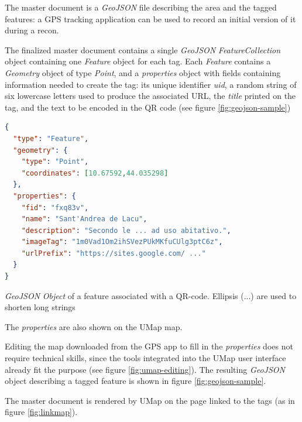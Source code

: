 \documentclass[sustainability,article,submit,pdftex,moreauthors]{Definitions/mdpi}
\begin{document}
The master document is a \emph{GeoJSON} file describing the area and the tagged features: a GPS tracking application can be used to record an initial version of it during a recon.

The finalized master document contains a single \emph{GeoJSON} \emph{FeatureCollection} object containing one \emph{Feature} object for each tag. Each \emph{Feature} contains a \emph{Geometry} object of type \emph{Point}, and a \emph{properties} object with fields containing information needed to create the tag: its unique identifier \emph{uid}, a random string of six lowercase letters used to produce the associated URL, the \emph{title} printed on the tag, and the text to be encoded in the QR code (see figure \ref{fig:geojson-sample})

\begin{table}
\begin{lstlisting}[language=json]
{
  "type": "Feature",
  "geometry": { 
    "type": "Point", 
    "coordinates": [10.67592,44.035298]
  },
  "properties": {
    "fid": "fxq83v",
    "name": "Sant'Andrea de Lacu",
    "description": "Secondo le ... ad uso abitativo.",
    "imageTag": "1m0Vad1Om2ihSVezPUkMKfuCUlg3ptC6z",
    "urlPrefix": "https://sites.google.com/ ..."
  }
}
\end{lstlisting}
\caption{\emph{GeoJSON} \emph{Object} of a feature associated with a QR-code. Ellipsis (...) are used to shorten long strings  \label{fig:geojson-sample}}
\end{table}

The \emph{properties} are also shown on the UMap map.

Editing the map downloaded from the GPS app to fill in the {\em properties} does not require technical skills, since the tools integrated into the UMap user interface already fit the purpose (see figure \ref{fig:umap-editing}). The resulting \emph{GeoJSON} object describing a tagged feature is shown in figure \ref{fig:geojson-sample}.

The master document is rendered by UMap on the page linked to the tags (as in figure \ref{fig:linkmap}).

\end{document}
